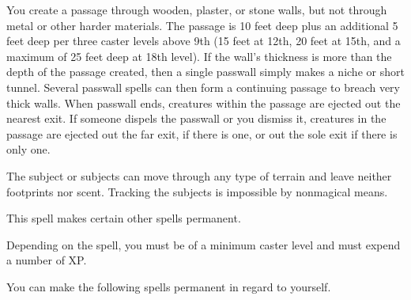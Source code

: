 \begin{multicols}{2}
\begin{small}
\noindent You create a passage through wooden, plaster, or stone walls, but not through metal or other harder materials. The passage is 10 feet deep plus an additional 5 feet deep per three caster levels above 9th (15 feet at 12th, 20 feet at 15th, and a maximum of 25 feet deep at 18th level). If the wall's thickness is more than the depth of the passage created, then a single passwall simply makes a niche or short tunnel. Several passwall spells can then form a continuing passage to breach very thick walls. When passwall ends, creatures within the passage are ejected out the nearest exit. If someone dispels the passwall or you dismiss it, creatures in the passage are ejected out the far exit, if there is one, or out the sole exit if there is only one.


\noindent The subject or subjects can move through any type of terrain and leave neither footprints nor scent. Tracking the subjects is impossible by nonmagical means.

\noindent This spell makes certain other spells permanent.

\smallskip\noindent Depending on the spell, you must be of a minimum caster level and must expend a number of XP.

\smallskip\noindent You can make the following spells permanent in regard to yourself.


\end{small}
\end{multicols}
